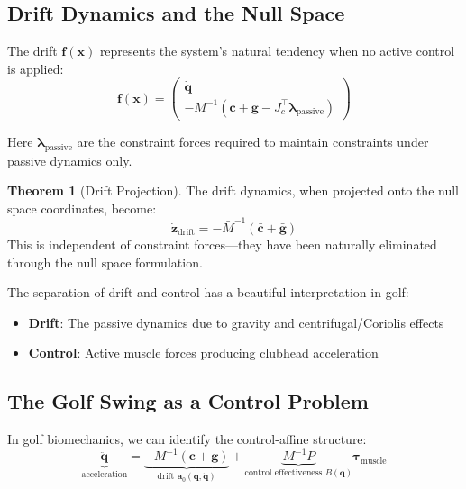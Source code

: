 \documentclass[11pt,a4paper]{article}
\theoremstyle{definition}
\newtheorem{theorem}{Theorem}[section]
\newcommand{\Jc}{J_c}
\newcommand{\qvec}{\bm{q}}
\newcommand{\xvec}{\bm{x}}
\newcommand{\fvec}{\bm{f}}
\newcommand{\gvec}{\bm{g}}
\newcommand{\avec}{\bm{a}}
\newcommand{\cvec}{\bm{c}}
\newcommand{\lambdavec}{\bm{\lambda}}
\newcommand{\tauvec}{\bm{\tau}}
\begin{document}
\subsection{Drift Dynamics and the Null Space}

The drift $\fvec(\xvec)$ represents the system's natural tendency when no active control is applied:
\begin{equation}
    \fvec(\xvec) = \begin{pmatrix} \dot{\qvec} \\ -M^{-1}(\cvec + \gvec - \Jc^\top \lambdavec_{\text{passive}}) \end{pmatrix}
\end{equation}

Here $\lambdavec_{\text{passive}}$ are the constraint forces required to maintain constraints under passive dynamics only.

\begin{theorem}[Drift Projection]
The drift dynamics, when projected onto the null space coordinates, become:
\begin{equation}
    \dot{\bm{z}}_{\text{drift}} = -\bar{M}^{-1}(\bar{\cvec} + \bar{\gvec})
\end{equation}
This is independent of constraint forces---they have been naturally eliminated through the null space formulation.
\end{theorem}

The separation of drift and control has a beautiful interpretation in golf:
\begin{itemize}[noitemsep]
    \item \textbf{Drift}: The passive dynamics due to gravity and centrifugal/Coriolis effects
    \item \textbf{Control}: Active muscle forces producing clubhead acceleration
\end{itemize}

\subsection{The Golf Swing as a Control Problem}

In golf biomechanics, we can identify the control-affine structure:
\begin{equation}
    \underbrace{\ddot{\qvec}}_{\text{acceleration}} = \underbrace{-M^{-1}(\cvec + \gvec)}_{\text{drift } \avec_0(\qvec, \dot{\qvec})} + \underbrace{M^{-1} P}_{\text{control effectiveness } B(\qvec)} \tauvec_{\text{muscle}}
\end{equation}
\end{document}
